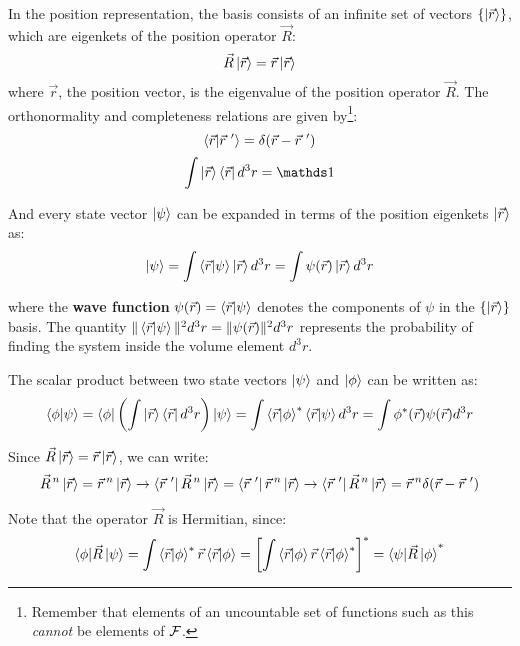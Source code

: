 In the position representation, the basis consists of an infinite set of vectors $\{\ket{\vec{r}}\}$, which are eigenkets of the position operator $\vec{R}$:
\begin{equation}
    \vec{R}\ket{\vec{r}} = \vec{r}\ket{\vec{r}}
\end{equation}
where $\vec{r}$, the position vector, is the eigenvalue of the position operator $\vec{R}$. The orthonormality and completeness relations are given by\footnote{Remember that elements of an uncountable set of functions such as this \textit{cannot} be elements of $\mathcal{F}$.}:
\begin{equation}
    \braket{\vec{r}|\vec{r}\ '} = \delta(\vec{r} - \vec{r}\ ')
\end{equation} 
\begin{equation}
    \int \ket{\vec{r}}\bra{\vec{r}} d^3r = \Imat
\end{equation}

And every state vector $\ket{\psi}$ can be expanded in terms of the position eigenkets $\ket{\vec{r}}$ as:
\begin{equation}
    \ket{\psi} = \int \braket{\vec{r}|\psi} \ket{\vec{r}} d^3 r = \int \psi(\vec{r}) \ket{\vec{r}} d^3 r
\end{equation}

where the \textbf{wave function} $\psi(\vec{r}) = \braket{\vec{r}|\psi}$ denotes the components of $\psi$ in the $\{\ket{\vec{r}}\}$ basis. The quantity $\|\braket{\vec{r}|\psi}\|^2d^3 r = \|\psi(\vec{r})\|^2d^3r$ represents the probability of finding the system inside the volume element $d^3r$.

The scalar product between two state vectors $\ket{\psi}$ and $\ket{\phi}$ can be written as:
\begin{equation}
    \braket{\phi|\psi} = \bra{\phi}\left(\int \ket{\vec{r}}\bra{\vec{r}}d^3r\right)\ket{\psi} = \int \braket{\vec{r}|\phi}^*\braket{\vec{r}|\psi} d^3r = \int \phi^*(\vec{r})\psi(\vec{r}) d^3r
\end{equation}

Since $\vec{R}\ket{\vec{r}} = \vec{r}\ket{\vec{r}}$, we can write:
\begin{equation}
    \vec{R}^{\, n}\ket{\vec{r}} = \vec{r}\, ^n\ket{\vec{r}} \to \bra{\vec{r}\ '}\vec{R}^{\, n}\ket{\vec{r}} = \bra{\vec{r}\ '}\vec{r}\, ^n\ket{\vec{r}} \to \bra{\vec{r}\ '}\vec{R}^{\, n}\ket{\vec{r}} = \vec{r}\, ^n\delta(\vec{r} - \vec{r}\ ')
\end{equation}

Note that the operator $\vec{R}$ is Hermitian, since:
\begin{equation}
    \braket{\phi|\vec{R}\,|\psi} = \int \braket{\vec{r}|\phi}^*\vec{r}\braket{\vec{r}|\phi} = \left[\int \braket{\vec{r}|\phi}\vec{r}\braket{\vec{r}|\phi}^*\right]^* = \braket{\psi|\vec{R}\,|\phi}^*
\end{equation}

